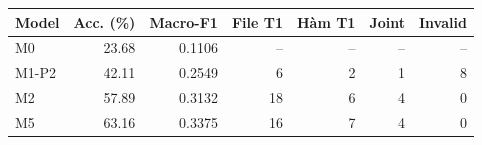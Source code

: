 \providecommand{\baselineModelName}{M1-P2}
\begin{tabular}{lrrrrrr}\toprule
Model & Acc. (\%) & Macro-F1 & File T1 & Hàm T1 & Joint & Invalid\\\midrule
M0 & 23.68 & 0.1106 & -- & -- & -- & --\\
\baselineModelName{} & 42.11 & 0.2549 & 6 & 2 & 1 & 8\\
M2 & 57.89 & 0.3132 & 18 & 6 & 4 & 0\\
M5 & 63.16 & 0.3375 & 16 & 7 & 4 & 0\\
\bottomrule\end{tabular}

